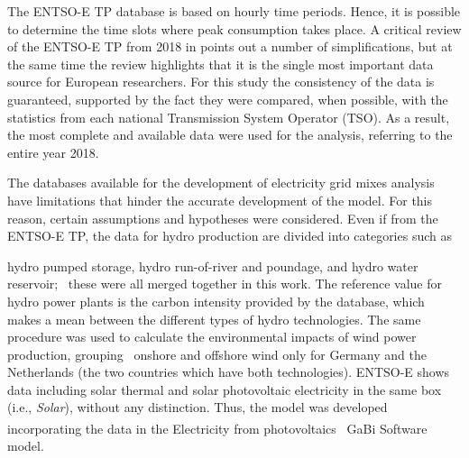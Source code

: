 {The ENTSO-E TP database is based on hourly time periods. Hence, it is possible to determine the time slots where peak consumption takes place. A critical review of the ENTSO-E TP from 2018 in \cite{Hirth2018ThePlatform} points out a number of simplifications, but at the same time the review highlights that it is the single most important data source for European researchers. For this study the consistency of the data is guaranteed, supported by the fact they were compared, when possible, with the statistics from each national Transmission System Operator (TSO). As a result, the most complete and available data were used for the analysis, referring to the entire year 2018.  %





The databases available for the development of electricity grid mixes analysis have limitations that hinder the accurate development of the model. For this reason, certain assumptions and hypotheses were considered. Even if from the ENTSO-E TP, the data for hydro production are divided into categories such as {hydro pumped storage, hydro run-of-river and poundage, and hydro water reservoir;%
~these were all merged together in this work. {The reference value for hydro power plants is the carbon intensity provided by the database, which makes a mean between the different types of hydro technologies}. The same procedure was used to calculate the environmental impacts of wind power production, {grouping}%
~onshore and offshore wind only for Germany and the Netherlands (the two countries which have both technologies). ENTSO-E shows data including solar thermal and solar photovoltaic electricity in the same box (i.e., \textit{Solar}), without any distinction. Thus, the model was developed incorporating the data in the Electricity from photovoltaics%
~GaBi\textsuperscript{\textregistered} Software model.


}}
